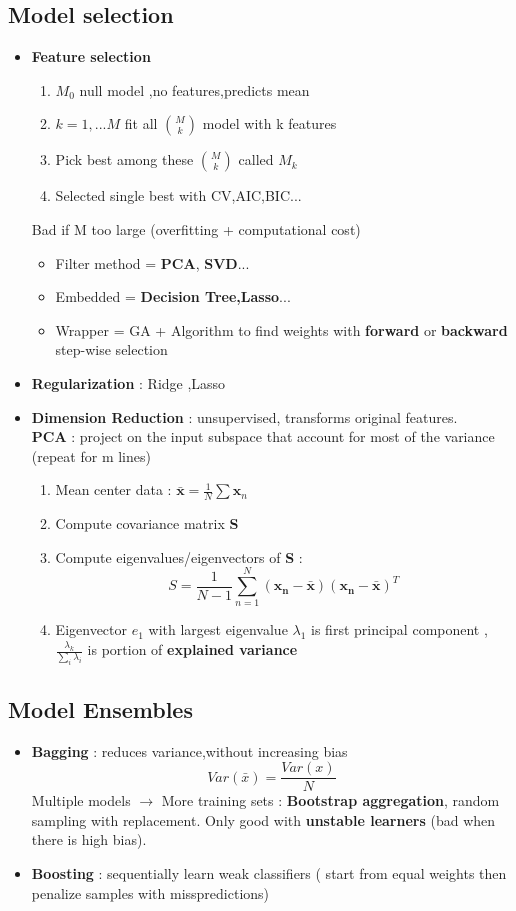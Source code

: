 \documentclass[12pt]{article} %
\begin{document}
\subsection{Model selection}
\begin{itemize}
\item \textbf{Feature selection} 
\begin{enumerate}
\item $M_0$ null model ,no features,predicts mean
\item $k=1,...M$ fit all $\binom{M}{k}$ model with k features
\item Pick best among these $\binom{M}{k}$ called $M_k$
\item Selected single best with CV,AIC,BIC...
\end{enumerate}
Bad if M too large (overfitting + computational cost) 
\begin{itemize}
\item Filter method = \textbf{PCA}, \textbf{SVD}...
\item Embedded = \textbf{Decision Tree,Lasso}...
\item Wrapper  = GA + Algorithm to find weights with \textbf{forward} or \textbf{backward} step-wise selection
\end{itemize}

\item \textbf{Regularization} : Ridge ,Lasso
\item \textbf{Dimension Reduction} : unsupervised, transforms original features.\\
\textbf{PCA} : project on the input subspace that account for most of the variance (repeat for m lines)
\begin{enumerate}
\item Mean center data : $\bar{\bm{x}} = \frac{1}{N} \sum \bm{x}_n$
\item Compute covariance matrix \textbf{S}
\item Compute eigenvalues/eigenvectors  of \textbf{S} : $$S= \frac{1}{N-1}\sum_{n=1}^N (\bm{x_n-\bar{x}}) (\bm{x_n-\bar{x}})^T$$
\item Eigenvector $e_1$ with largest eigenvalue $\lambda_1$ is first principal component , $\frac{\lambda_k}{\sum \limits_i \lambda_i}$ is portion of \textbf{explained variance}
\end{enumerate}
\end{itemize}

\subsection{Model Ensembles}
\begin{itemize}
\item \textbf{Bagging} : reduces variance,without increasing bias
$$ Var(\bar{x}) =\frac{Var(x)}{N} $$
Multiple models $\rightarrow$ More training sets : \textbf{Bootstrap aggregation}, random sampling with replacement. Only good with \textbf{unstable learners} (bad when there is high bias).
\item \textbf{Boosting} : sequentially learn weak classifiers  ( start from equal weights then penalize samples with misspredictions)
\end{itemize}
\end{document}
